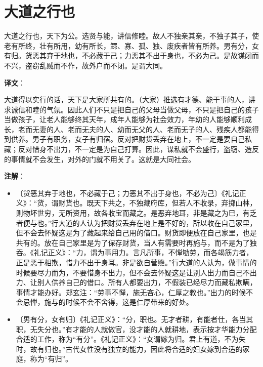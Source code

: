 \documentclass[12pt,UTF-8,openany]{ctexbook}
\begin{document}
\chapter{大道之行也}

\begin{normalsize}
    
    大道之行也，天下为公。选贤与能，讲信修睦。故人不独亲其亲，不独子其子，使老有所终，壮有所用，幼有所长，鳏、寡、孤、独、废疾者皆有所养。男有分，女有归。货恶其弃于地也，不必藏于己；力恶其不出于身也，不必为己。是故谋闭而不兴，盗窃乱贼而不作，故外户而不闭。是谓大同。
\end{normalsize}


\newpage

\textbf{译文}：

\vspace{1em}

\begin{normalsize}
    
    大道得以实行的话，天下是大家所共有的。（大家）推选有才德、能干事的人，讲求诚信和睦的气氛。因此人们不只是把自己的父母当做父母，不只是把自己的孩子当做孩子，让老人能够终其天年，成年人能够为社会效力，年幼的人能够顺利成长，老而无妻的人、老而无夫的人、幼而无父的人、老而无子的人、残疾人都能得到供养。男子有职务，女子有归宿。反对把财货丢弃在地上，不一定是要自己私藏；反对惜身不出力，不一定是为自己打算。因此，谋私就不会盛行，盗窃、造反的事情就不会发生，对外的门就不用关了。这就是大同社会。
    
\end{normalsize}


\newpage

\textbf{注解}：

\vspace{-1em}

\begin{itemize}
    \setlength\itemsep{-0.2em}
    \item〔货恶其弃于地也，不必藏于己；力恶其不出于身也，不必为己〕《礼记正义》：“货，谓财货也。既天下共之，不独藏府库，但若人不收录，弃掷山林，则物坏世穷，无所资用，故各收宝而藏之。是恶弃地耳，非是藏之为巳，有乏者便与也。”行大道的人认为把财货丢弃在地上是不好的，所以收在自己家里，但不会去怀疑这是为了藏起来给自己用的借口。财货即便放在自己家里，也是共有的。放在自己家里是为了保存财货，当人有需要时再施与，而不是为了独吞。《礼记正义》：“力，谓为事用力。言凡所事，不惮劬劳，而各竭筋力者，正是恶于相欺，惜力不出于身耳。非是欲自营赡。”行大道的人认为，做事情的时候要尽力而为，不要惜身不出力，但不会去怀疑这是让别人出力而自己不出力、让别人供养自己的借口。所有人都要出力，不假装已经尽力而藏私欺瞒，事情才能办好。郑玄注：“劳事不惮，施无吝心，仁厚之教也。”出力的时候不会忌惮，施与的时候不会不舍得，这是仁厚带来的好处。
    \item〔男有分，女有归〕《礼记正义》：“分，职也。无才者耕，有能者仕，各当其职，无失分也。”有才能的人就做官，没才能的人就耕地，表示按才华能力分配合适的工作，称为“有分”。《礼记正义》：“女谓嫁为归。君上有道，不为失时，故有归也。”古代女性没有独立的能力，因此将合适的妇女嫁到合适的家庭，称为“有归”。
\end{itemize}
\end{document}
